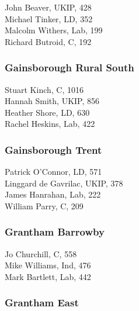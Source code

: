 \documentclass[a4paper,openany,10pt]{book}
\begin{document}


John Beaver, UKIP, 428\\
Michael Tinker, LD, 352\\
Malcolm Withers, Lab, 199\\
Richard Butroid, C, 192\\


\subsubsection*{Gainsborough Rural South}



Stuart Kinch, C, 1016\\
Hannah Smith, UKIP, 856\\
Heather Shore, LD, 630\\
Rachel Heskins, Lab, 422\\


\subsubsection*{Gainsborough Trent}



Patrick O'Connor, LD, 571\\
Linggard de Gavrilac, UKIP, 378\\
James Hanrahan, Lab, 222\\
William Parry, C, 209\\


\subsubsection*{Grantham Barrowby}



Jo Churchill, C, 558\\
Mike Williams, Ind, 476\\
Mark Bartlett, Lab, 442\\


\subsubsection*{Grantham East}

\end{document}
